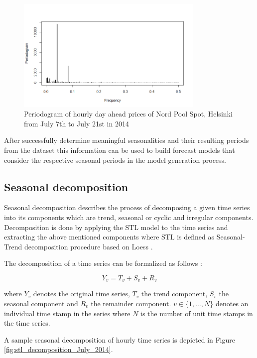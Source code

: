 \begin{figure}[htbp]
	\centering
		\includegraphics[width=0.8\textwidth]{figures/forecasting/periodogram_July_2014.png}
	\caption{Periodogram of hourly day ahead prices of Nord Pool Spot, Helsinki from July 7th to July 21st in 2014}
	\label{fig:periodogram_July_2014}
\end{figure}

After successfully determine meaningful seasonalities and their resulting periods from the dataset this information can be used to build forecast models that consider the respective seasonal periods in the model generation process. 



\subsection{Seasonal decomposition} \label{ssec:seasonal_decomposition}

Seasonal decomposition describes the process of decomposing a given time series into its components which are trend, seasonal or cyclic and irregular components. Decomposition is done by applying the STL model to the time series and extracting the above mentioned components where STL is defined as Seasonal-Trend decomposition procedure based on Loess \cite{cleveland1990stl}. 

The decomposition of a time series can be formalized as follows \cite{cleveland1990stl}: 

	\[ Y_v = T_v + S_v + R_v \]
	
where $Y_v$ denotes the original time series, $T_v$ the trend component, $S_v$ the seasonal component and $R_v$ the remainder component. $v \in \{ 1,\ldots,N \}$ denotes an individual time stamp in the series where $N$ is the number of unit time stamps in the time series. 

A sample seasonal decomposition of hourly time series is depicted in Figure \ref{fig:stl_decomposition_July_2014}. 

